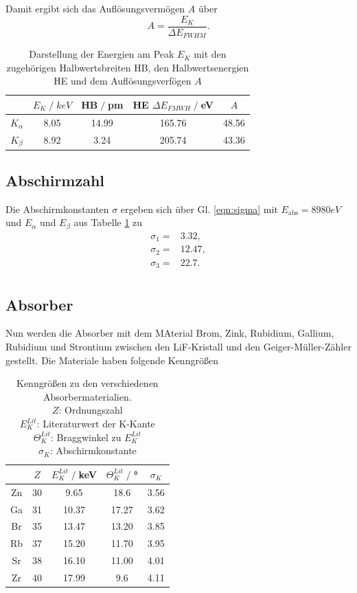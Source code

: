 Damit ergibt sich das Auflösungsvermögen $A$ über
\begin{equation}
    A=\frac{E_K}{\Delta E_{FWHM}}.
\end{equation}
\begin{table}[H]
    \centering
    \begin{tabular}{c | c c c c}
        \toprule
        & $E_K\;/\;\si{keV}$ & HB$\;/\;$pm & HE $\Delta E_{FMWH}\;/\;$eV&$A$\\
        \midrule
        $K_{\alpha}$ & 8.05 & 14.99 & 165.76 &48.56\\
        $K_{\beta}$  & 8.92 & 3.24  & 205.74 &43.36\\
        \bottomrule
    \end{tabular}
    \caption{Darstellung der Energien am Peak $E_K$ mit den zugehörigen Halbwertsbreiten
    HB, den Halbwertsenergien HE und dem Auflösungsverfögen $A$}
    \label{tab:tabelle1}
\end{table}
\subsection{Abschirmzahl}
Die Abschirmkonstanten $\sigma$ ergeben sich über Gl. \ref{eqn:sigma} mit $E_{\text{abs}}=8980\si{eV}$
und $E_{\alpha}$ und $E_{\beta}$ aus Tabelle \ref{tab:tabelle1} zu
\begin{align*}
    \sigma_1=&3.32,\\
    \sigma_2=&12.47,\\
    \sigma_3=&22.7.\\
\end{align*}
\subsection{Absorber}
Nun werden die Absorber mit dem MAterial Brom, Zink, Rubidium, Gallium, Rubidium und Strontium
zwischen den LiF-Kristall und den Geiger-Müller-Zähler gestellt.
Die Materiale haben folgende Kenngrößen
\begin{table}
    \centering
    \begin{tabular}{c | c c c c}
        \toprule
        &$Z$ & $E_K^{Lit}\;/\;$keV & $\Theta_K^{Lit}\;/\;$° & $\sigma_K$\\
        \midrule
        Zn & 30 & 9.65 & 18.6 & 3.56\\
        Ga & 31 & 10.37 & 17.27 &3.62\\
        Br & 35 & 13.47 & 13.20 &3.85\\
        Rb & 37 & 15.20 & 11.70 &3.95\\
        Sr & 38 & 16.10 & 11.00 &4.01\\
        Zr & 40 & 17.99 & 9.6 & 4.11\\
        \bottomrule
    \end{tabular}
    \caption{Kenngrößen zu den verschiedenen Absorbermaterialien.\cite{ref}\\
    $Z$: Ordnungszahl\\
    $E_K^{Lit}$: Literaturwert der K-Kante\\
    $\Theta_K^{Lit}$: Braggwinkel zu $E_K^{Lit}$\\
    $\sigma_K$: Abschirmkonstante}
    \label{tab:kenngroesse}
\end{table}
